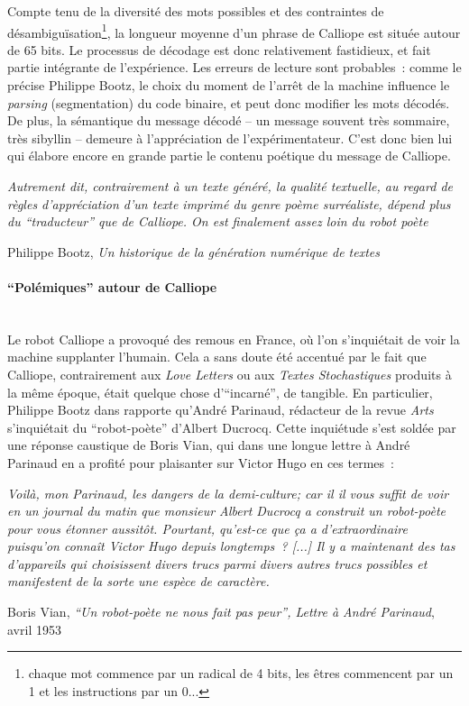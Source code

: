 \documentclass{article}
\newcommand{\subsubsubsection}[1]{\paragraph{#1}\mbox{}\\}
\newenvironment{citationbox}
{\begin{center}
		\begin{minipage}{.8\textwidth}
		}
		{
		\end{minipage}	
\end{center}
}
\begin{document}
					\vspace{2mm}
					Compte tenu de la diversité des mots possibles et des contraintes de désambiguïsation\footnote{chaque mot commence par un radical de 4 bits, les êtres commencent par un 1 et les instructions par un 0...}, la longueur moyenne d'un phrase de Calliope est située autour de 65 bits. Le processus de décodage est donc relativement fastidieux, et fait partie intégrante de l'expérience. Les erreurs de lecture sont probables~: comme le précise Philippe Bootz, le choix du moment de l'arrêt de la machine influence le \textit{parsing} (segmentation) du code binaire, et peut donc modifier les mots décodés. De plus, la sémantique du message décodé -- un message souvent très sommaire, très sibyllin -- demeure à l'appréciation de l'expérimentateur. C'est donc bien lui qui élabore encore en grande partie le contenu poétique du message de Calliope.
					\begin{citationbox}
						\textit{Autrement dit, contrairement à
						un texte généré, la qualité textuelle, au regard de règles d'appréciation d'un texte
						imprimé du genre poème surréaliste, dépend plus du ``traducteur'' que de
						Calliope. On est finalement assez loin du robot poète}
					\begin{flushright}
						Philippe Bootz, \textit{Un historique de la génération numérique de textes} \cite{bootz}
					\end{flushright}
					\end{citationbox}
				\subsubsubsection{``Polémiques'' autour de Calliope}
					Le robot Calliope a provoqué des remous en France, où l'on s'inquiétait de voir la machine supplanter l'humain. Cela a sans doute été accentué par le fait que Calliope, contrairement aux \textit{Love Letters} ou aux \textit{Textes Stochastiques} produits à la même époque, était quelque chose d'``incarné'', de tangible. En particulier, Philippe Bootz dans \cite{bootz} rapporte qu'André Parinaud, rédacteur de la revue \textit{Arts} s'inquiétait du ``robot-poète'' d'Albert Ducrocq. Cette inquiétude s'est soldée par une réponse caustique de Boris Vian, qui dans une longue lettre à André Parinaud en a profité pour plaisanter sur Victor Hugo en ces termes~:
					\begin{citationbox}
						\textit{Voilà, mon Parinaud, les dangers de la demi-culture; car il il vous suffit de voir en un journal du matin que monsieur Albert Ducrocq a construit un robot-poète pour vous étonner aussitôt. Pourtant, qu'est-ce que ça a d'extraordinaire puisqu'on connaît Victor Hugo depuis longtemps~? [...] Il y a maintenant des tas d'appareils qui choisissent divers trucs parmi divers autres trucs possibles et manifestent de la sorte une espèce de caractère.}
						\begin{flushright}
							Boris Vian, \textit{``Un robot-poète ne nous fait pas peur'', Lettre à André Parinaud}, avril 1953  \cite{vian1953}
						\end{flushright}
					\end{citationbox}
					
\end{document}
